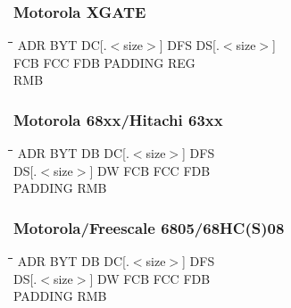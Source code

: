 \subsubsection{Motorola XGATE}
{\tt\begin{tabbing}
\hspace{3cm}\=\hspace{3cm}\=\hspace{3cm}\=\hspace{3cm}\=\kill
ADR        \> BYT         \> DC[.$<$size$>$] \> DFS     \> DS[.$<$size$>$] \\
FCB        \> FCC         \> FDB         \> PADDING     \> REG \\
RMB \\
\end{tabbing}}

\subsubsection{Motorola 68xx/Hitachi 63xx}
{\tt\begin{tabbing}
\hspace{3cm}\=\hspace{3cm}\=\hspace{3cm}\=\hspace{3cm}\=\kill
ADR        \> BYT         \> DB          \> DC[.$<$size$>$] \> DFS     \\
DS[.$<$size$>$] \> DW     \> FCB         \> FCC         \> FDB         \\
PADDING     \> RMB \\
\end{tabbing}}

\subsubsection{Motorola/Freescale 6805/68HC(S)08}
{\tt\begin{tabbing}
\hspace{3cm}\=\hspace{3cm}\=\hspace{3cm}\=\hspace{3cm}\=\kill
ADR        \> BYT         \> DB          \> DC[.$<$size$>$] \> DFS     \\
DS[.$<$size$>$] \> DW     \> FCB         \> FCC         \> FDB         \\
PADDING     \> RMB \\
\end{tabbing}}


